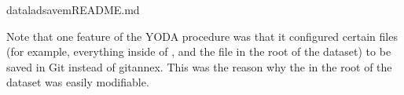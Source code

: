 \begin{sphinxVerbatim}[commandchars=\\\{\}]
dataladsave\PYGZhy{}mREADME.md
\end{sphinxVerbatim}

\sphinxAtStartPar
Note that one feature of the YODA procedure was that it configured certain files
(for example, everything inside of , and the  file in the
root of the dataset) to be saved in Git instead of git\sphinxhyphen{}annex. This was the
reason why the  in the root of the dataset was easily modifiable.

